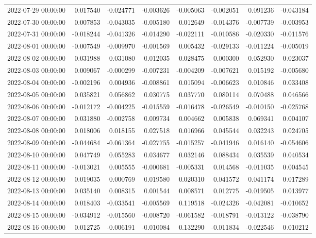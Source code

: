 \begin{tabular}{lrrrrrrr}
2022-07-29 00:00:00 & 0.017540 & -0.024771 & -0.003626 & -0.005063 & -0.002051 & 0.091236 & -0.043184 \\
2022-07-30 00:00:00 & 0.007853 & -0.043035 & -0.005180 & 0.012649 & -0.014376 & -0.007739 & -0.003953 \\
2022-07-31 00:00:00 & -0.018244 & -0.041326 & -0.014290 & -0.022111 & -0.010586 & -0.020330 & -0.011576 \\
2022-08-01 00:00:00 & -0.007549 & -0.009970 & -0.001569 & 0.005432 & -0.029133 & -0.011224 & -0.005019 \\
2022-08-02 00:00:00 & -0.031988 & -0.031080 & -0.012035 & -0.028475 & 0.000300 & -0.052930 & -0.023037 \\
2022-08-03 00:00:00 & 0.009067 & -0.000299 & -0.007231 & -0.004209 & -0.007621 & 0.015192 & -0.005680 \\
2022-08-04 00:00:00 & -0.002196 & 0.004936 & -0.008861 & 0.015094 & -0.006623 & 0.010846 & 0.033408 \\
2022-08-05 00:00:00 & 0.035821 & 0.056862 & 0.030775 & 0.037770 & 0.080114 & 0.070488 & 0.046566 \\
2022-08-06 00:00:00 & -0.012172 & -0.004225 & -0.015559 & -0.016478 & -0.026549 & -0.010150 & -0.025768 \\
2022-08-07 00:00:00 & 0.031880 & -0.002758 & 0.009734 & 0.004662 & 0.005838 & 0.069341 & 0.004107 \\
2022-08-08 00:00:00 & 0.018006 & 0.018155 & 0.027518 & 0.016966 & 0.045544 & 0.032243 & 0.024705 \\
2022-08-09 00:00:00 & -0.044684 & -0.061364 & -0.027755 & -0.015257 & -0.041946 & 0.016140 & -0.054606 \\
2022-08-10 00:00:00 & 0.047749 & 0.055283 & 0.034677 & 0.032146 & 0.088434 & 0.035539 & 0.040534 \\
2022-08-11 00:00:00 & -0.013021 & 0.005555 & -0.000681 & -0.005331 & 0.014568 & -0.011035 & 0.004545 \\
2022-08-12 00:00:00 & 0.019035 & 0.000769 & 0.019580 & 0.020310 & 0.041572 & 0.041174 & 0.017289 \\
2022-08-13 00:00:00 & 0.035140 & 0.008315 & 0.001544 & 0.008571 & 0.012775 & -0.019505 & 0.013977 \\
2022-08-14 00:00:00 & 0.018403 & -0.033541 & -0.005569 & 0.119518 & -0.024326 & -0.042081 & -0.010652 \\
2022-08-15 00:00:00 & -0.034912 & -0.015560 & -0.008720 & -0.061582 & -0.018791 & -0.013122 & -0.038790 \\
2022-08-16 00:00:00 & 0.012725 & -0.006191 & -0.010084 & 0.132290 & -0.011834 & -0.022546 & 0.010212 \\

\end{tabular}
